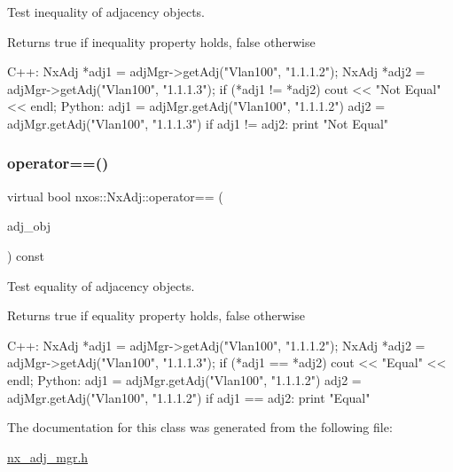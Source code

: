 Test inequality of adjacency objects.

\begin{DoxyReturn}{Returns}
true if inequality property holds, false otherwise
\end{DoxyReturn}

\begin{DoxyCode}
C++:
    NxAdj *adj1 = adjMgr->getAdj(\textcolor{stringliteral}{"Vlan100"}, \textcolor{stringliteral}{"1.1.1.2"});
    NxAdj *adj2 = adjMgr->getAdj(\textcolor{stringliteral}{"Vlan100"}, \textcolor{stringliteral}{"1.1.1.3"});
    \textcolor{keywordflow}{if} (*adj1 != *adj2)
        cout << \textcolor{stringliteral}{"Not Equal"} << endl;
Python:
    adj1 = adjMgr.getAdj(\textcolor{stringliteral}{"Vlan100"}, \textcolor{stringliteral}{"1.1.1.2"})
    adj2 = adjMgr.getAdj(\textcolor{stringliteral}{"Vlan100"}, \textcolor{stringliteral}{"1.1.1.3"})
    \textcolor{keywordflow}{if} adj1 != adj2:
         print \textcolor{stringliteral}{"Not Equal"}
\end{DoxyCode}
 \mbox{\label{classnxos_1_1_nx_adj_a19eea20ba216dd722d783bbb0982814e}} 
\subsubsection{\texorpdfstring{operator==()}{operator==()}}
{\footnotesize\ttfamily virtual bool nxos\+::\+Nx\+Adj\+::operator== (\begin{DoxyParamCaption}\item[{\mbox{\hyperlink{classnxos_1_1_nx_adj}{Nx\+Adj}} const \&}]{adj\+\_\+obj }\end{DoxyParamCaption}) const\hspace{0.3cm}{\ttfamily [pure virtual]}}

Test equality of adjacency objects.

\begin{DoxyReturn}{Returns}
true if equality property holds, false otherwise
\end{DoxyReturn}

\begin{DoxyCode}
C++:
    NxAdj *adj1 = adjMgr->getAdj(\textcolor{stringliteral}{"Vlan100"}, \textcolor{stringliteral}{"1.1.1.2"});
    NxAdj *adj2 = adjMgr->getAdj(\textcolor{stringliteral}{"Vlan100"}, \textcolor{stringliteral}{"1.1.1.3"});
    \textcolor{keywordflow}{if} (*adj1 == *adj2)
        cout << \textcolor{stringliteral}{"Equal"} << endl;
Python:
    adj1 = adjMgr.getAdj(\textcolor{stringliteral}{"Vlan100"}, \textcolor{stringliteral}{"1.1.1.2"})
    adj2 = adjMgr.getAdj(\textcolor{stringliteral}{"Vlan100"}, \textcolor{stringliteral}{"1.1.1.2"})
    \textcolor{keywordflow}{if} adj1 == adj2:
         print \textcolor{stringliteral}{"Equal"}
\end{DoxyCode}
 

The documentation for this class was generated from the following file\+:\begin{DoxyCompactItemize}
\item 
\mbox{\hyperlink{nx__adj__mgr_8h}{nx\+\_\+adj\+\_\+mgr.\+h}}\end{DoxyCompactItemize}
